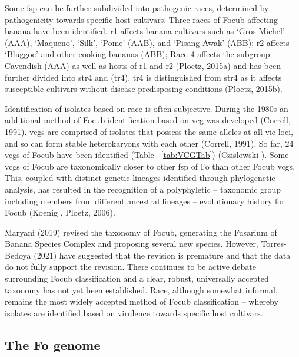 Some \ac{fsp} can be further subdivided into pathogenic races, determined by pathogenicity towards specific host cultivars. Three races of \ac{Focub} affecting banana have been identified. \acf{r1}  affects banana cultivars such as ‘Gros Michel’ (AAA), ‘Maqueno’, ‘Silk’, ‘Pome’ (AAB), and ‘Pisang Awak’ (ABB); \acf{r2} affects ‘Bluggoe’ and other cooking bananas (ABB); Race 4 affects the subgroup Cavendish (AAA) as well as hosts of \ac{r1} and \ac{r2} (Ploetz, 2015a) and has been further divided into \ac{str4} and (\ac{tr4}). \Ac{tr4} is distinguished from \ac{str4} as it affects susceptible cultivars without disease-predisposing conditions (Ploetz, 2015b).  

Identification of isolates based on race is often subjective. During the 1980s an additional method of \ac{Focub} identification based on \ac{vcg} was developed (Correll, 1991). \acp{vcg} are comprised of isolates that possess the same alleles at all \ac{vic} loci, and so can form stable heterokaryons with each other (Correll, 1991). So far, 24 \acp{vcg} of \ac{Focub} have been identified (Table ~\ref{tab:VCGTab}) (Czislowski ).  Some \acp{vcg} of \ac{Focub} are taxonomically closer to other \ac{fsp} of \ac{Fo} than other \ac{Focub} \acp{vcg}. This, coupled with distinct genetic lineages identified through phylogenetic analysis, has resulted in the recognition of a polyphyletic – taxonomic group including members from different ancestral lineages – evolutionary history for \ac{Focub} (Koenig , Ploetz, 2006). 



Maryani \et (2019) revised the taxonomy of \ac{Focub}, generating the Fusarium of Banana Species Complex and proposing several new species. However, Torres-Bedoya \et (2021) have suggested that the revision is premature and that the data do not fully support the revision. There continues to be active debate surrounding \ac{Focub} classification and a clear, robust, universally accepted taxonomy has not yet been established. Race, although somewhat informal, remains the most widely accepted method of \ac{Focub} classification – whereby isolates are identified based on virulence towards specific host cultivars.  


\subsection{The \acl{Fo} genome} 


